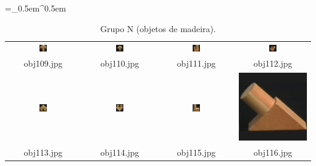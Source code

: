 \begin{table}[H]
  \centering
  \caption{Grupo N (objetos de madeira).}
  \tabulinesep =_0.5em^0.5em
  \everyrow{\tabucline[0.4pt]-}
  \begin{tabu}{|cccc|}
    \includegraphics[width=0.1\textwidth,height=0.1\textwidth]{imagens/coil_100/objetos_madeira/obj12__0.png} &
    \includegraphics[width=0.1\textwidth,height=0.1\textwidth]{imagens/coil_100/objetos_madeira/obj12__0_1.png} &
    \includegraphics[width=0.1\textwidth,height=0.1\textwidth]{imagens/coil_100/objetos_madeira/obj41__0.png} &
    \includegraphics[width=0.1\textwidth,height=0.1\textwidth]{imagens/coil_100/objetos_madeira/obj41__0_1.png}
    \\
    \scriptsize{obj109.jpg} & \scriptsize{obj110.jpg} & \scriptsize{obj111.jpg} &
    \scriptsize{obj112.jpg}
    \\
    \includegraphics[width=0.1\textwidth,height=0.1\textwidth]{imagens/coil_100/objetos_madeira/obj51__0.png} &
    \includegraphics[width=0.1\textwidth,height=0.1\textwidth]{imagens/coil_100/objetos_madeira/obj51__0_1.png} &
    \includegraphics[width=0.1\textwidth,height=0.1\textwidth]{imagens/coil_100/objetos_madeira/obj77__0.png} &
    \includegraphics[width=0.1\linewidth,height=0.1\linewidth]{imagens/coil_100/objetos_madeira/obj80__0.png}
    \\
    \scriptsize{obj113.jpg} & \scriptsize{obj114.jpg} & \scriptsize{obj115.jpg} &
    \scriptsize{obj116.jpg}
  \end{tabu}
\end{table}

